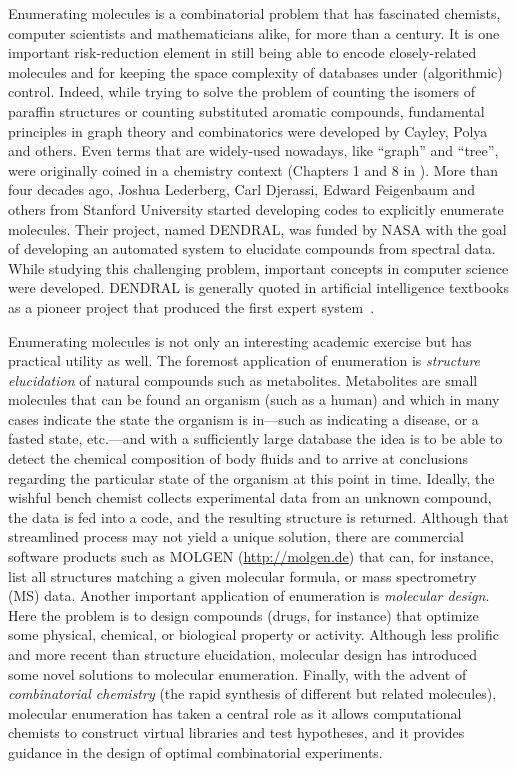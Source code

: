 \documentclass{sig-alternate}
\begin{document}
Enumerating molecules is a combinatorial problem that has fascinated
chemists, computer scientists and mathematicians alike, for more than a
century. It is one important risk-reduction element in still being
able to encode closely-related molecules and for keeping the space
complexity of databases under (algorithmic) control. Indeed, while
trying to solve the problem of counting the isomers of paraffin
structures or counting substituted aromatic compounds, fundamental
principles in graph theory and combinatorics were developed by Cayley,
Polya and others. Even terms that are widely-used nowadays, like ``graph''
and ``tree'', were originally coined in a chemistry context (Chapters 1 and
8 in \cite{faulon2010}). More than four decades ago, Joshua Lederberg,
Carl Djerassi, Edward Feigenbaum and others from Stanford University
started developing codes to explicitly enumerate molecules. Their
project, named DENDRAL, was funded by NASA with the goal of developing
an automated system to elucidate compounds from spectral data. While
studying this challenging problem, important concepts in computer
science were developed. DENDRAL is generally quoted in artificial
intelligence textbooks as a pioneer project that produced the first
expert system~\cite{DENDRAL}.

Enumerating molecules is not only an interesting academic exercise but has
practical utility as well. The foremost application of enumeration is \emph{structure
elucidation} of natural compounds such as metabolites. Metabolites are small molecules that can be found an organism
(such as a human) and which in many cases indicate the state the organism is in---such as indicating a disease, or a
fasted state, etc.---and with a sufficiently large database the idea is to be able to detect the chemical composition of
body fluids and to arrive at conclusions regarding the particular state of the organism at this point in time.
Ideally, the wishful bench chemist collects experimental data
from an unknown compound, the data is fed into a code, and the resulting
structure is returned. Although that streamlined process may not yield a unique
solution, there are commercial software products such as MOLGEN
(\url{http://molgen.de}) that can, for instance, list all structures matching a given
molecular formula, or mass spectrometry (MS) data. Another important application
of enumeration is \emph{molecular design}. Here the problem is to design compounds
(drugs, for instance) that optimize some physical, chemical, or biological
property or activity. Although less prolific and more recent than structure
elucidation, molecular design has introduced some novel solutions to molecular
enumeration. Finally, with the advent of \emph{combinatorial chemistry} (the rapid synthesis of different but related molecules), molecular
enumeration has taken a central role as it allows computational chemists to
construct virtual libraries and test hypotheses, and it provides guidance in the
design of optimal combinatorial experiments.
\end{document}
